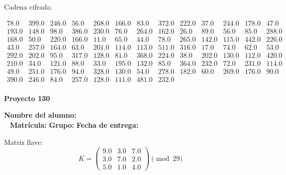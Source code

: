 \documentclass[12pt]{article}
\begin{document}
Cadena cifrada:
\begin{center}
$\begin{array}{lllllllllllll}
78.0 & 399.0 & 246.0 & 56.0 & 268.0 & 166.0 & 83.0 & 372.0 & 222.0 & 37.0 & 244.0 & 178.0 & 47.0\\
193.0 & 148.0 & 98.0 & 386.0 & 230.0 & 76.0 & 264.0 & 162.0 & 26.0 & 89.0 & 56.0 & 85.0 & 288.0\\
168.0 & 50.0 & 220.0 & 166.0 & 11.0 & 65.0 & 44.0 & 78.0 & 265.0 & 142.0 & 115.0 & 442.0 & 226.0\\
43.0 & 257.0 & 164.0 & 63.0 & 201.0 & 114.0 & 113.0 & 511.0 & 316.0 & 17.0 & 74.0 & 62.0 & 53.0\\
292.0 & 202.0 & 95.0 & 317.0 & 128.0 & 81.0 & 368.0 & 224.0 & 38.0 & 202.0 & 130.0 & 112.0 & 420.0\\
210.0 & 34.0 & 121.0 & 88.0 & 33.0 & 195.0 & 132.0 & 85.0 & 364.0 & 232.0 & 72.0 & 231.0 & 114.0\\
49.0 & 251.0 & 176.0 & 94.0 & 328.0 & 130.0 & 54.0 & 278.0 & 182.0 & 60.0 & 269.0 & 176.0 & 90.0\\
390.0 & 246.0 & 84.0 & 257.0 & 128.0 & 111.0 & 481.0 & 232.0\\
\end{array}$
\end{center}

\newpage


\textbf{Proyecto 130}

\textbf{Nombre del alumno:} \underline{\hspace{13cm}}\\\
\vspace{1cm}
\textbf{Matrícula:} \underline{\hspace{4cm}} \hspace{1cm}
\textbf{Grupo:} \underline{\hspace{2cm}}
\textbf{Fecha de entrega:} \underline{\hspace{2cm}}

\medskip

Matriz llave:
\[
K = \begin{pmatrix}
9.0 & 3.0 & 7.0\\
3.0 & 7.0 & 2.0\\
5.0 & 1.0 & 4.0
\end{pmatrix} \pmod{29}
\]
\end{document}
